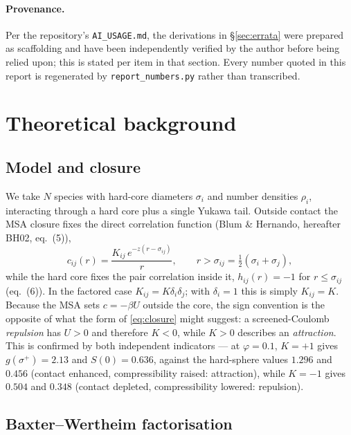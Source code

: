 \documentclass[11pt,a4paper]{article}
\newcommand{\eqBH}[1]{eq.~(#1)}
\newcommand{\code}[1]{\texttt{#1}}
\begin{document}
\paragraph{Provenance.} Per the repository's \code{AI\_USAGE.md}, the
derivations in \S\ref{sec:errata} were prepared as scaffolding and have been
independently verified by the author before being relied upon; this is stated
per item in that section. Every number quoted in this report is regenerated by
\code{report\_numbers.py} rather than transcribed.

\section{Theoretical background}

\subsection{Model and closure}

We take $N$ species with hard-core diameters $\sigma_i$ and number densities
$\rho_i$, interacting through a hard core plus a single Yukawa tail. Outside
contact the MSA closure fixes the direct correlation function
(Blum \& Hernando, hereafter BH02, \eqBH{5}),
\begin{equation}
  c_{ij}(r)=\frac{K_{ij}\,e^{-z(r-\sigma_{ij})}}{r},\qquad r>\sigma_{ij}
  =\tfrac12(\sigma_i+\sigma_j),
  \label{eq:closure}
\end{equation}
while the hard core fixes the pair correlation inside it,
$h_{ij}(r)=-1$ for $r\le\sigma_{ij}$ (\eqBH{6}). In the factored case
$K_{ij}=K\delta_i\delta_j$; with $\delta_i=1$ this is simply $K_{ij}=K$.
Because the MSA sets $c=-\beta U$ outside the core, the sign convention is the
opposite of what the form of \eqref{eq:closure} might suggest: a screened-Coulomb
\emph{repulsion} has $U>0$ and therefore $K<0$, while $K>0$ describes an
\emph{attraction}. This is confirmed by both independent indicators --- at
$\varphi=0.1$, $K=+1$ gives $g(\sigma^+)=2.13$ and $S(0)=0.636$, against the
hard-sphere values $1.296$ and $0.456$ (contact enhanced, compressibility
raised: attraction), while $K=-1$ gives $0.504$ and $0.348$ (contact depleted,
compressibility lowered: repulsion).

\subsection{Baxter--Wertheim factorisation}
\end{document}
